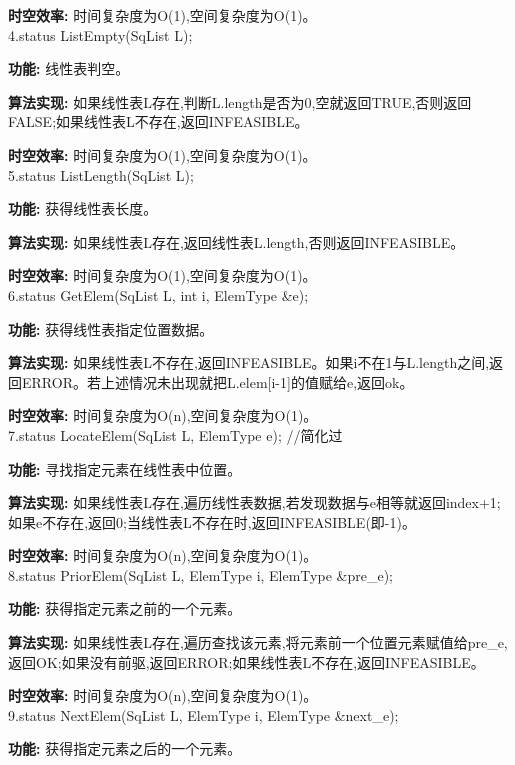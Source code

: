 \documentclass[supercite]{Experimental_Report}
\theoremstyle{definition}
\begin{document}
\textbf{时空效率: }时间复杂度为O(1),空间复杂度为O(1)。\\

4.status ListEmpty(SqList L);

\textbf{功能: }线性表判空。

\textbf{算法实现: }如果线性表L存在,判断L.length是否为0,空就返回TRUE,否则返回FALSE;如果线性表L不存在,返回INFEASIBLE。

\textbf{时空效率: }时间复杂度为O(1),空间复杂度为O(1)。\\

5.status ListLength(SqList L);

\textbf{功能: }获得线性表长度。

\textbf{算法实现: }如果线性表L存在,返回线性表L.length,否则返回INFEASIBLE。

\textbf{时空效率: }时间复杂度为O(1),空间复杂度为O(1)。\\

6.status GetElem(SqList L, int i, ElemType \&e);

\textbf{功能: }获得线性表指定位置数据。

\textbf{算法实现: }如果线性表L不存在,返回INFEASIBLE。如果i不在1与L.length之间,返回ERROR。若上述情况未出现就把L.elem[i-1]的值赋给e,返回ok。

\textbf{时空效率: }时间复杂度为O(n),空间复杂度为O(1)。\\

7.status LocateElem(SqList L, ElemType e); //简化过

\textbf{功能: }寻找指定元素在线性表中位置。

\textbf{算法实现: }如果线性表L存在,遍历线性表数据,若发现数据与e相等就返回index+1;如果e不存在,返回0;当线性表L不存在时,返回INFEASIBLE(即-1)。

\textbf{时空效率: }时间复杂度为O(n),空间复杂度为O(1)。\\

8.status PriorElem(SqList L, ElemType i, ElemType \&pre\_e);

\textbf{功能: }获得指定元素之前的一个元素。

\textbf{算法实现: }如果线性表L存在,遍历查找该元素,将元素前一个位置元素赋值给pre\_e,返回OK;如果没有前驱,返回ERROR;如果线性表L不存在,返回INFEASIBLE。

\textbf{时空效率: }时间复杂度为O(n),空间复杂度为O(1)。\\

9.status NextElem(SqList L, ElemType i, ElemType \&next\_e);

\textbf{功能: }获得指定元素之后的一个元素。
\end{document}
